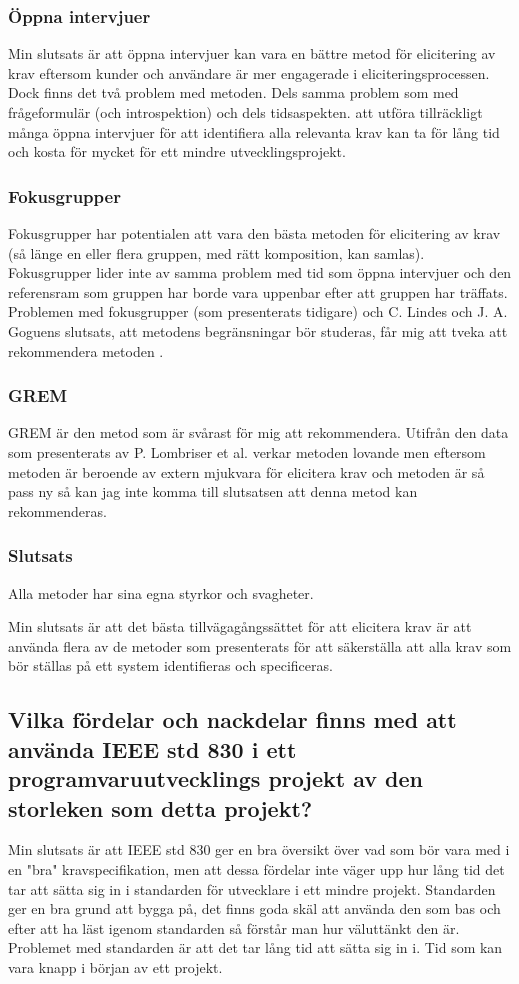 \subsubsection{Öppna intervjuer}
Min slutsats är att öppna intervjuer kan vara en bättre metod för elicitering av krav eftersom kunder och användare är mer engagerade i eliciteringsprocessen. Dock finns det två problem med metoden. Dels samma problem som med frågeformulär (och introspektion) och dels tidsaspekten. att utföra tillräckligt många öppna intervjuer för att identifiera alla relevanta krav kan ta för lång tid och kosta för mycket för ett mindre utvecklingsprojekt.

\subsubsection{Fokusgrupper}
Fokusgrupper har potentialen att vara den bästa metoden för elicitering av krav (så länge en eller flera gruppen, med rätt komposition, kan samlas). Fokusgrupper lider inte av samma problem med tid som öppna intervjuer och den referensram som gruppen har borde vara uppenbar efter att gruppen har träffats. Problemen med fokusgrupper (som presenterats tidigare) och C. Lindes och J. A. Goguens slutsats, att metodens begränsningar bör studeras, får mig att tveka att rekommendera metoden \cite{goguen1993techniques}.

\subsubsection{GREM}
GREM är den metod som är svårast för mig att rekommendera. Utifrån den data som presenterats av P. Lombriser et al. \cite{lombriser2016gamified} verkar metoden lovande men eftersom metoden är beroende av extern mjukvara för elicitera krav och metoden är så pass ny så kan jag inte komma till slutsatsen att denna metod kan rekommenderas.

\subsubsection{Slutsats}
Alla metoder har sina egna styrkor och svagheter.

Min slutsats är att det bästa tillvägagångssättet för att elicitera krav är att använda flera av de metoder som presenterats för att säkerställa att alla krav som bör ställas på ett system identifieras och specificeras.        

\subsection{Vilka fördelar och nackdelar finns med att använda IEEE std 830 i ett programvaruutvecklings projekt av den storleken som detta projekt?}
Min slutsats är att IEEE std 830 ger en bra översikt över vad som bör vara med i en "bra" kravspecifikation, men att dessa fördelar inte väger upp hur lång tid det tar att sätta sig in i standarden för utvecklare i ett mindre projekt. Standarden ger en bra grund att bygga på, det finns goda skäl att använda den som bas och efter att ha läst igenom standarden så förstår man hur väluttänkt den är. Problemet med standarden är att det tar lång tid att sätta sig in i. Tid som kan vara knapp i början av ett projekt. 

